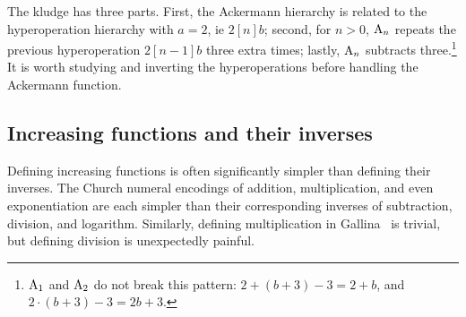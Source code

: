 The kludge has three parts. First, the Ackermann hierarchy is related
to the hyperoperation hierarchy with $a=2$, ie $2[n]b$;
second, for $n>0$, $\text{A}_n$ repeats the previous hyperoperation $2[n-1]b$
three extra times;
lastly, $\text{A}_n$ subtracts three.\footnote{$\text{A}_{1}$ and $\text{A}_{2}$ do not break this pattern: $2 + (b + 3) - 3 = 2 + b$, and $2 \cdot (b + 3) - 3 = 2b + 3$.}
It is worth studying and inverting the hyperoperations before handling the Ackermann function.





\subsection{Increasing functions and their inverses}
Defining increasing functions is often significantly simpler than defining their inverses.
The Church numeral encodings of addition, multiplication, and even exponentiation
are each simpler than their corresponding inverses of subtraction, division, and logarithm. Similarly, defining multiplication in Gallina~\cite{coq} is trivial, but defining division is unexpectedly painful.\\[5pt]

